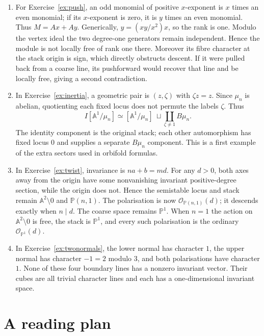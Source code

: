 \documentclass[11pt,a4paper]{article}
\numberwithin{equation}{section}
\theoremstyle{definition}
\newcommand{\A}{\mathbb A}
\newcommand{\PP}{\mathbb P}
\newcommand{\OO}{\mathcal O}
\begin{document}
\begin{enumerate}[label=\textbf{\arabic*.},leftmargin=*]
\item For Exercise~\ref{ex:push}, an odd monomial of positive $x$-exponent
is $x$ times an even monomial; if its $x$-exponent is zero, it is $y$
times an even monomial. Thus $M=Ax+Ay$. Generically,
$y=(xy/x^2)x$, so the rank is one. Modulo the vertex ideal the two
degree-one generators remain independent. Hence the module is not
locally free of rank one there. Moreover its fibre character at the
stack origin is sign, which directly obstructs descent. If it were
pulled back from a coarse line, its pushforward would recover that line
and be locally free, giving a second contradiction.

\item In Exercise~\ref{ex:inertia}, a geometric pair is $(z,\zeta)$ with
$\zeta z=z$. Since $\mu_n$ is abelian, quotienting each fixed locus
does not permute the labels $\zeta$. Thus
\[
 I[\A^1/\mu_n]
 \simeq[\A^1/\mu_n]\ \sqcup\!
 \coprod_{\zeta\ne1}B\mu_n.
\]
The identity component is the original stack; each other automorphism
has fixed locus $0$ and supplies a separate $B\mu_n$ component. This
is a first example of the extra sectors used in orbifold formulas.

\item In Exercise~\ref{ex:twist}, invariance is $na+b=md$. For any
$d>0$, both axes away from the origin have some nonvanishing invariant
positive-degree section, while the origin does not. Hence the
semistable locus and stack remain $\A^2\setminus0$ and $\PP(n,1)$.
The polarisation is now $\OO_{\PP(n,1)}(d)$; it descends exactly when
$n\mid d$. The coarse space remains $\PP^1$. When $n=1$ the action
on $\A^2\setminus0$ is free, the stack is $\PP^1$, and every such
polarisation is the ordinary $\OO_{\PP^1}(d)$.

\item In Exercise~\ref{ex:twonormals}, the lower normal has character
$1$, the upper normal has character $-1=2$ modulo $3$, and both
polarisations have character $1$. None of these four boundary lines
has a nonzero invariant vector. Their cubes are all trivial character
lines and each has a one-dimensional invariant space.
\end{enumerate}

\section{A reading plan}
\label{sec:dictionary}
\end{document}
